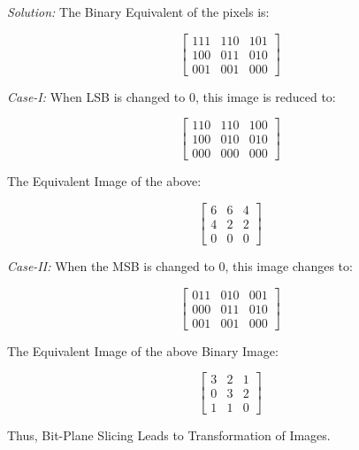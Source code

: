 \textit{Solution:}
The Binary Equivalent of the pixels is:

\begin{equation*}
    \begin{bmatrix}
        111 & 110 & 101\\
        100 & 011 & 010\\
        001 & 001 & 000
    \end{bmatrix}
\end{equation*}

\textit{Case-I:} When LSB is changed to 0, this image is reduced to:

\begin{equation*}
    \begin{bmatrix}
        110 & 110 & 100\\
        100 & 010 & 010\\
        000 & 000 & 000
    \end{bmatrix}
\end{equation*}

The Equivalent Image of the above:

\begin{equation*}
    \begin{bmatrix}
        6 & 6 & 4\\
        4 & 2 & 2\\
        0 & 0 & 0
    \end{bmatrix}
\end{equation*}

\textit{Case-II:} When the MSB is changed to 0, this image changes to:

\begin{equation*}
    \begin{bmatrix}
        011 & 010 & 001\\
        000 & 011 & 010\\
        001 & 001 & 000
    \end{bmatrix}
\end{equation*}

The Equivalent Image of the above Binary Image:

\begin{equation*}
    \begin{bmatrix}
        3 & 2 & 1\\
        0 & 3 & 2\\
        1 & 1 & 0
    \end{bmatrix}
\end{equation*}

Thus, Bit-Plane Slicing Leads to Transformation of Images.